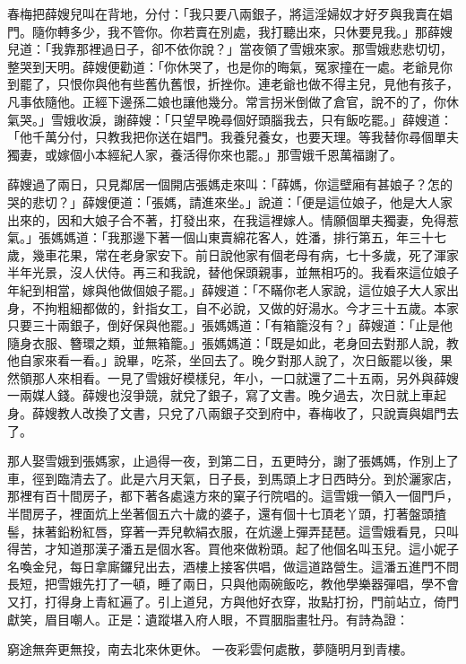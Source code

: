 春梅把薛嫂兒叫在背地，分付：「我只要八兩銀子，將這淫婦奴才好歹與我賣在娼門。隨你轉多少，我不管你。你若賣在別處，我打聽出來，只休要見我。」那薛嫂兒道：「我靠那裡過日子，卻不依你說？」當夜領了雪娥來家。那雪娥悲悲切切，整哭到天明。薛嫂便勸道：「你休哭了，也是你的晦氣，冤家撞在一處。老爺見你到罷了，只恨你與他有些舊仇舊恨，折挫你。連老爺也做不得主兒，見他有孩子，凡事依隨他。正經下邊孫二娘也讓他幾分。常言拐米倒做了倉官，說不的了，你休氣哭。」雪娥收淚，謝薛嫂：「只望早晚尋個好頭腦我去，只有飯吃罷。」薛嫂道：「他千萬分付，只教我把你送在娼門。我養兒養女，也要天理。等我替你尋個單夫獨妻，或嫁個小本經紀人家，養活得你來也罷。」那雪娥千恩萬福謝了。

薛嫂過了兩日，只見鄰居一個開店張媽走來叫：「薛媽，你這壁廂有甚娘子？怎的哭的悲切？」薛嫂便道：「張媽，請進來坐。」說道：「便是這位娘子，他是大人家出來的，因和大娘子合不著，打發出來，在我這裡嫁人。情願個單夫獨妻，免得惹氣。」張媽媽道：「我那邊下著一個山東賣綿花客人，姓潘，排行第五，年三十七歲，幾車花果，常在老身家安下。前日說他家有個老母有病，七十多歲，死了渾家半年光景，沒人伏侍。再三和我說，替他保頭親事，並無相巧的。我看來這位娘子年紀到相當，嫁與他做個娘子罷。」薛嫂道：「不瞞你老人家說，這位娘子大人家出身，不拘粗細都做的，針指女工，自不必說，又做的好湯水。今才三十五歲。本家只要三十兩銀子，倒好保與他罷。」張媽媽道：「有箱籠沒有？」薛嫂道：「止是他隨身衣服、簪環之類，並無箱籠。」張媽媽道：「既是如此，老身回去對那人說，教他自家來看一看。」說畢，吃茶，坐回去了。晚夕對那人說了，次日飯罷以後，果然領那人來相看。一見了雪娥好模樣兒，年小，一口就還了二十五兩，另外與薛嫂一兩媒人錢。薛嫂也沒爭競，就兌了銀子，寫了文書。晚夕過去，次日就上車起身。薛嫂教人改換了文書，只兌了八兩銀子交到府中，春梅收了，只說賣與娼門去了。

那人娶雪娥到張媽家，止過得一夜，到第二日，五更時分，謝了張媽媽，作別上了車，徑到臨清去了。此是六月天氣，日子長，到馬頭上才日西時分。到於灑家店，那裡有百十間房子，都下著各處遠方來的窠子行院唱的。這雪娥一領入一個門戶，半間房子，裡面炕上坐著個五六十歲的婆子，還有個十七頂老丫頭，打著盤頭揸髻，抹著鉛粉紅唇，穿著一弄兒軟絹衣服，在炕邊上彈弄琵琶。這雪娥看見，只叫得苦，才知道那漢子潘五是個水客。買他來做粉頭。起了他個名叫玉兒。這小妮子名喚金兒，每日拿廝鑼兒出去，酒樓上接客供唱，做這道路營生。這潘五進門不問長短，把雪娥先打了一頓，睡了兩日，只與他兩碗飯吃，教他學樂器彈唱，學不會又打，打得身上青紅遍了。引上道兒，方與他好衣穿，妝點打扮，門前站立，倚門獻笑，眉目嘲人。正是：遺蹤堪入府人眼，不買胭脂畫牡丹。有詩為證：

窮途無奔更無投，南去北來休更休。
一夜彩雲何處散，夢隨明月到青樓。

